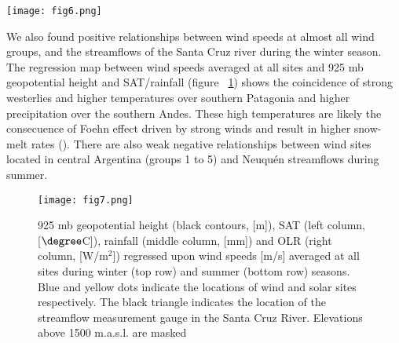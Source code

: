 \documentclass[AMA,Times1COL]{WileyNJDv5} %
\begin{document}
\begin{linenumbers}
\begin{figure*}[hbpt]
	\centering
	\hspace*{-1cm}   
	\texttt{[image: fig6.png]}
	\caption{\label{matriz1} Correlation matrices between seasonally averaged wind speeds, solar radiation, and streamflows. Statistically significant correlations at the 90\% confidence level are indicated by their numerical values.}
\end{figure*}

We also found positive relationships between wind speeds at almost all wind groups, and the streamflows of the Santa Cruz river during the winter season. The regression map between wind speeds averaged at all sites and 925 mb geopotential height and SAT/rainfall (figure ~\ref{reg1}) shows the coincidence of strong westerlies and higher temperatures over southern Patagonia and higher precipitation over the southern Andes. These high temperatures are likely the consecuence of Foehn effect driven by strong winds and result in higher snow-melt rates (\cite{bozkurt2018foehn}). There are also weak negative relationships between wind sites located in central Argentina (groups 1 to 5) and Neuquén streamflows during summer.

\begin{figure}[hbpt]
	\centering
	\hspace*{0cm}   
	\texttt{[image: fig7.png]}
	
	\caption{\label{reg1} 925 mb geopotential  height (black contours, [m]), SAT (left column, [$\degree$C]), rainfall (middle column, [mm]) and OLR (right column, [W/m$^2$]) regressed upon wind speeds [m/s] averaged at all sites during winter (top row) and summer (bottom row) seasons. Blue and yellow dots indicate the locations of wind and solar sites respectively. The black triangle indicates the location of the streamflow measurement gauge in the Santa Cruz River. Elevations above 1500 m.a.s.l. are masked}
		
\end{figure}


\end{linenumbers}
\end{document}

